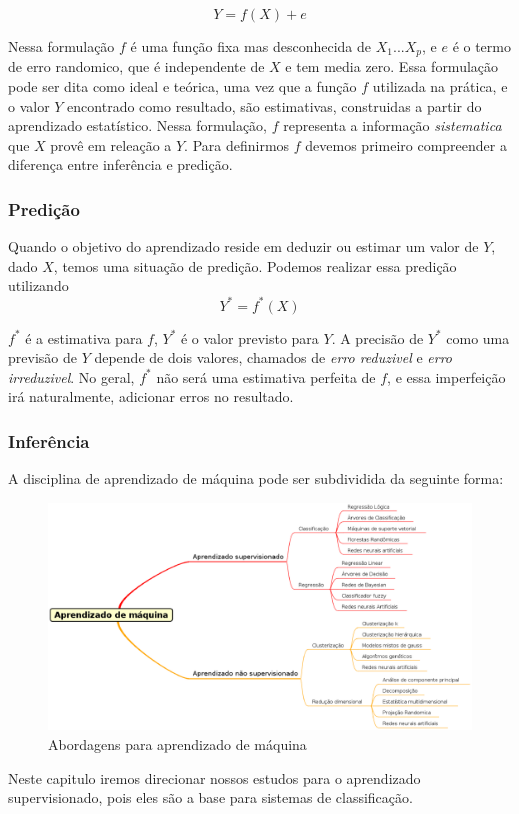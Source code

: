 \[
  Y = f(X) + e
\]

Nessa formulação $f$ é uma função fixa mas desconhecida de $X_1...X_p$, e $e$ é o termo de erro randomico, que é independente de $X$ e tem media zero. Essa formulação pode ser dita
como ideal e teórica, uma vez que a função $f$ utilizada na prática, e o valor $Y$ encontrado como resultado, são estimativas, construidas a partir do aprendizado estatístico.
Nessa formulação, $f$ representa a informação \textit{sistematica} que $X$ provê em releação a $Y$\cite{Jordan}.  
Para definirmos $f$ devemos primeiro compreender a diferença entre inferência e predição.
\subsubsection{Predição}
Quando o objetivo do aprendizado reside em deduzir ou estimar um valor de $Y$, dado $X$, temos uma situação de predição. Podemos realizar essa predição utilizando 
\[
  Y^* = f^*(X)
\]

$f^*$ é a estimativa para $f$, $Y^*$ é o valor previsto para $Y$. A precisão de $Y^*$ como uma previsão de $Y$ depende de dois valores, chamados de \textit{erro reduzivel} e \textit{erro irreduzivel}. No geral, $f^*$ não será uma estimativa perfeita de $f$, e essa imperfeição irá naturalmente, adicionar erros no resultado\cite{Jordan}.
\subsubsection{Inferência}


A disciplina de aprendizado de máquina pode ser subdividida da seguinte forma:
\begin{figure}[h]
	\centering
	\label{fig01}
        \includegraphics[scale=0.33]{figuras/mind1.eps}
	\caption{Abordagens para aprendizado de máquina}
\end{figure}
Neste capitulo iremos direcionar nossos estudos para o aprendizado supervisionado, pois eles são a base para sistemas de classificação.

